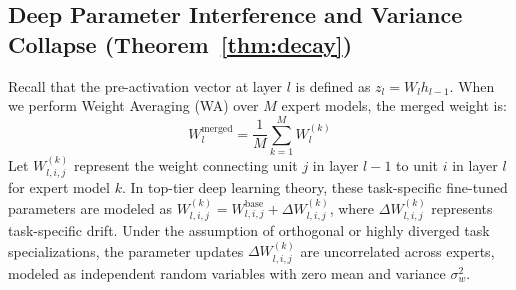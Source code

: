 \documentclass{article}
\theoremstyle{plain}
\theoremstyle{definition}
\theoremstyle{remark}
\begin{document}
\subsection{Deep Parameter Interference and Variance Collapse (Theorem~\ref{thm:decay})}
Recall that the pre-activation vector at layer $l$ is defined as $z_l = W_l h_{l-1}$. When we perform Weight Averaging (WA) over $M$ expert models, the merged weight is:
\begin{equation}
W_l^{\text{merged}} = \frac{1}{M}\sum_{k=1}^M W_l^{(k)}
\end{equation}
Let $W_{l, i, j}^{(k)}$ represent the weight connecting unit $j$ in layer $l-1$ to unit $i$ in layer $l$ for expert model $k$. In top-tier deep learning theory, these task-specific fine-tuned parameters are modeled as $W_{l, i, j}^{(k)} = W_{l, i, j}^{\text{base}} + \Delta W_{l, i, j}^{(k)}$, where $\Delta W_{l, i, j}^{(k)}$ represents task-specific drift. Under the assumption of orthogonal or highly diverged task specializations, the parameter updates $\Delta W_{l, i, j}^{(k)}$ are uncorrelated across experts, modeled as independent random variables with zero mean and variance $\sigma^2_w$.
\end{document}
